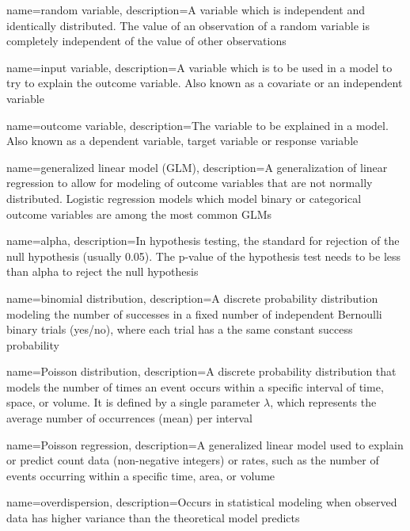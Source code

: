 {
    name={random variable},
    description={A variable which is independent and identically distributed.  The value of an observation of a random variable is completely independent of the value of other observations}
}

{
    name={input variable},
    description={A variable which is to be used in a model to try to explain the outcome variable.  Also known as a covariate or an independent variable}
}

{
    name={outcome variable},
    description={The variable to be explained in a model.  Also known as a dependent variable, target variable or response variable}
}

{
    name={generalized linear model (GLM)},
    description={A generalization of linear regression to allow for modeling of outcome variables that are not normally distributed.  Logistic regression models which model binary or categorical outcome variables are among the most common GLMs}
}

{
    name={alpha},
    description={In hypothesis testing, the standard for rejection of the null hypothesis (usually 0.05).  The p-value of the hypothesis test needs to be less than alpha to reject the null hypothesis}
}

{
    name={binomial distribution},
    description={A discrete probability distribution modeling the number of successes in a fixed number of independent Bernoulli binary trials (yes/no), where each trial has a the same constant success probability}
}

{
    name={Poisson distribution},
    description={A discrete probability distribution that models the number of times an event occurs within a specific interval of time, space, or volume. It is defined by a single parameter \ensuremath{\lambda}, which represents the average number of occurrences (mean) per interval}
}

{
    name={Poisson regression},
    description={A generalized linear model used to explain or predict count data (non-negative integers) or rates, such as the number of events occurring within a specific time, area, or volume}
}

{
    name={overdispersion},
    description={Occurs in statistical modeling when observed data has higher variance than the theoretical model predicts}
}

